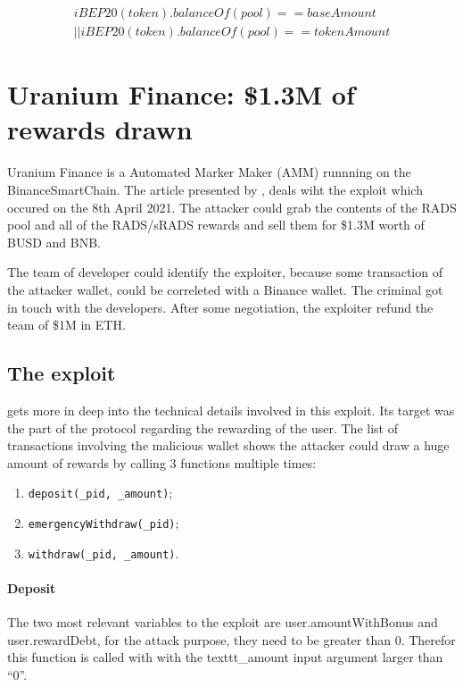 \begin{equation}
    \begin{split}
        iBEP20(token).balanceOf(pool) == baseAmount \\
        || iBEP20(token).balanceOf(pool) == tokenAmount
    \end{split}
\end{equation}

\section{Uranium Finance: \$1.3M of rewards drawn}   
\label{sec:Exploits:Uranium}
Uranium Finance is a Automated Marker Maker (AMM) runnning on the BinanceSmartChain.
The article presented by \citet{UraniumPM}, deals wiht the exploit which occured on the 
8th April 2021. The attacker could grab the contents of the RADS pool and all of the RADS/sRADS rewards 
and sell them for \$1.3M worth of BUSD and BNB.

The team of developer could identify the exploiter, because some transaction of the attacker wallet, could be 
correleted with a Binance wallet. The criminal got in touch with the developers. After some negotiation, 
the exploiter refund the team of \$1M in ETH.

\subsection{The exploit}
\label{sec:Uranium:Exploit}

\citet{UraniumTech} gets more in deep into the technical details involved in this exploit.
Its target was the part of the protocol regarding the rewarding of the user.
The list of transactions involving the malicious wallet shows the attacker could draw a huge amount of rewards 
by calling 3 functions multiple times:
\begin{enumerate}
    \item \texttt{deposit(\_pid, \_amount)}; 
    \item \texttt{emergencyWithdraw(\_pid)}; 
    \item \texttt{withdraw(\_pid, \_amount)}.
\end{enumerate}


\paragraph{Deposit} The two most relevant variables to the exploit are user.amountWithBonus and user.rewardDebt, for the attack purpose, they need to be greater than 0.
Therefor this function is called with  with the texttt{\_amount} input argument larger than “0”. 

